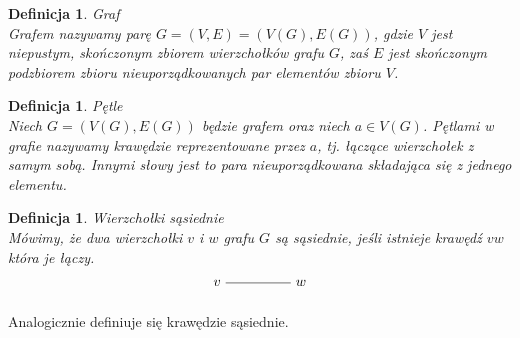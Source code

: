 \documentclass[12pt,a4paper]{report}
\newtheorem{definition}[theorem]{Definicja}
\begin{document}
\begin{definition}{Graf \cite[w oparciu o rozdział 2]{wilson2008}}\\
Grafem nazywamy parę $G=(V,E)=(V(G),E(G))$, gdzie $V$ jest niepustym, skończonym zbiorem wierzchołków grafu $G$, zaś $E$ jest skończonym podzbiorem zbioru nieuporządkowanych par elementów zbioru $V$.
\end{definition}

\begin{definition}{Pętle \cite[Rozdział 2]{wilson2008}}\\
Niech $G=(V(G), E(G))$ będzie grafem oraz niech $a \in V(G)$. Pętlami w grafie nazywamy krawędzie reprezentowane przez $a$, tj. łączące wierzchołek z samym sobą. Innymi słowy jest to para nieuporządkowana składająca się z jednego elementu.
\end{definition}


\begin{definition}{Wierzchołki sąsiednie \cite[Rozdział 2]{wilson2008}}\\
Mówimy, że dwa wierzchołki $v$ i $w$ grafu $G$ są sąsiednie, jeśli istnieje krawędź $vw$ która je łączy. 
$$
\begin{tikzpicture}[scale=.7]
  \node (v) at (-2,0) {$v$};
  \node (w) at (1,0) {$w$};
  \draw (v)--(w); 
  
\end{tikzpicture}
$$
\end{definition}
Analogicznie definiuje się krawędzie sąsiednie.
\end{document}
